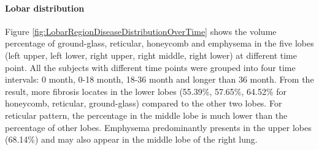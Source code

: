 \paragraph{Lobar distribution}
Figure \ref{fig:LobarRegionDiseaseDistributionOverTime} shows the volume percentage of ground-glass, reticular, honeycomb and emphysema in the five lobes (left upper, left lower, right upper, right middle, right lower) at different time point. All the subjects with different time points were grouped into four time intervals: 0 month, 0-18 month, 18-36 month and longer than 36 month. From the result, more fibrosis locates in the lower lobes (55.39\%, 57.65\%, 64.52\% for honeycomb, reticular, ground-glass) compared to the other two lobes. For reticular pattern, the percentage in the middle lobe is much lower than the percentage of other lobes. Emphysema predominantly presents in the upper lobes (68.14\%) and may also appear in the middle lobe of the right lung.

